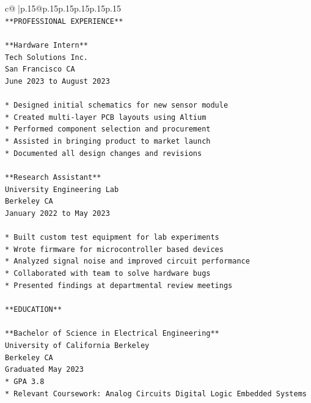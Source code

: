 \documentclass{article}
\begin{document}
{\begin{supertabular}{c@{$\;$}|p{.15\linewidth}@{}p{.15\linewidth}p{.15\linewidth}p{.15\linewidth}p{.15\linewidth}p{.15\linewidth}}
{{{\\ 
\texttt{**PROFESSIONAL EXPERIENCE**} \\
\\ 
\texttt{**Hardware Intern**} \\
\texttt{Tech Solutions Inc.} \\
\texttt{San Francisco CA} \\
\texttt{June 2023 to August 2023} \\
\\ 
\texttt{*   Designed initial schematics for new sensor module} \\
\texttt{*   Created multi{-}layer PCB layouts using Altium} \\
\texttt{*   Performed component selection and procurement} \\
\texttt{*   Assisted in bringing product to market launch} \\
\texttt{*   Documented all design changes and revisions} \\
\\ 
\texttt{**Research Assistant**} \\
\texttt{University Engineering Lab} \\
\texttt{Berkeley CA} \\
\texttt{January 2022 to May 2023} \\
\\ 
\texttt{*   Built custom test equipment for lab experiments} \\
\texttt{*   Wrote firmware for microcontroller based devices} \\
\texttt{*   Analyzed signal noise and improved circuit performance} \\
\texttt{*   Collaborated with team to solve hardware bugs} \\
\texttt{*   Presented findings at departmental review meetings} \\
\\ 
\texttt{**EDUCATION**} \\
\\ 
\texttt{**Bachelor of Science in Electrical Engineering**} \\
\texttt{University of California Berkeley} \\
\texttt{Berkeley CA} \\
\texttt{Graduated May 2023} \\
\texttt{*   GPA 3.8} \\
\texttt{*   Relevant Coursework: Analog Circuits Digital Logic Embedded Systems} \\
\\ 
}}}
\end{supertabular}}
\end{document}
